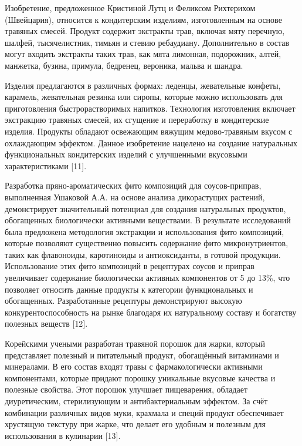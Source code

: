 \begin{multicols}{2}
Изобретение, предложенное Кристиной Лутц и Феликсом Рихтерихом
(Швейцария), относится к кондитерским изделиям, изготовленным на основе
травяных смесей. Продукт содержит экстракты трав, включая мяту перечную,
шалфей, тысячелистник, тимьян и стевию ребаудиану. Дополнительно в
состав могут входить экстракты таких трав, как мята лимонная,
подорожник, алтей, манжетка, бузина, примула, бедренец, вероника, мальва
и шандра.

Изделия предлагаются в различных формах: леденцы, жевательные конфеты,
карамель, жевательная резинка или сиропы, которые можно использовать для
приготовления быстрорастворимых напитков. Технология изготовления
включает экстракцию травяных смесей, их сгущение и переработку в
кондитерские изделия. Продукты обладают освежающим вяжущим
медово-травяным вкусом с охлаждающим эффектом. Данное изобретение
нацелено на создание натуральных функциональных кондитерских изделий с
улучшенными вкусовыми характеристиками {[}11{]}.

Разработка пряно-ароматических фито композиций для соусов-приправ,
выполненная Ушаковой А.А. на основе анализа дикорастущих растений,
демонстрирует значительный потенциал для создания натуральных продуктов,
обогащенных биологически активными веществами. В результате исследований
была предложена методология экстракции и использования фито композиций,
которые позволяют существенно повысить содержание фито микронутриентов,
таких как флавоноиды, каротиноиды и антиоксиданты, в готовой продукции.
Использование этих фито композиций в рецептурах соусов и приправ
увеличивает содержание биологически активных компонентов от 5 до 13\%,
что позволяет относить данные продукты к категории функциональных и
обогащенных. Разработанные рецептуры демонстрируют высокую
конкурентоспособность на рынке благодаря их натуральному составу и
богатству полезных веществ {[}12{]}.

Корейскими учеными разработан травяной порошок для жарки, который
представляет полезный и питательный продукт, обогащённый витаминами и
минералами. В его состав входят травы с фармакологически активными
компонентами, которые придают порошку уникальные вкусовые качества и
полезные свойства. Этот порошок улучшает пищеварения, обладает
диуретическим, стерилизующим и антибактериальным эффектом. За счёт
комбинации различных видов муки, крахмала и специй продукт обеспечивает
хрустящую текстуру при жарке, что делает его удобным и полезным для
использования в кулинарии {[}13{]}.


\end{multicols}
